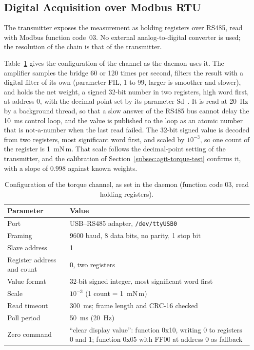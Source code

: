 \subsection{Digital Acquisition over Modbus RTU}
\label{subsec:agit-torque-acq}

The transmitter exposes the measurement as holding registers over RS485, read with Modbus function code~03. No external analog-to-digital converter is used; the resolution of the chain is that of the transmitter.

Table~\ref{tab:modbus} gives the configuration of the channel as the daemon uses it. The amplifier samples the bridge 60 or 120 times per second, filters the result with a digital filter of its own (parameter FIL, 1 to 99, larger is smoother and slower), and holds the net weight, a signed 32-bit number in two registers, high word first, at address 0, with the decimal point set by its parameter Sd~\citep{atoman2026,atomodbus2026}. It is read at 20~Hz by a background thread, so that a slow answer of the RS485 bus cannot delay the 10~ms control loop, and the value is published to the loop as an atomic number that is not-a-number when the last read failed. The 32-bit signed value is decoded from two registers, most significant word first, and scaled by $10^{-3}$, so one count of the register is 1~mN\,m. That scale follows the decimal-point setting of the transmitter, and the calibration of Section~\ref{subsec:agit-torque-test} confirms it, with a slope of 0.998 against known weights.

\begin{table}[htbp]
    \centering
    \caption[Serial and register configuration of the torque channel]{Configuration of the torque channel, as set in the daemon (function code 03, read holding registers).}
    \label{tab:modbus}
    \small
    \begin{tabular}{@{}ll@{}}
        \toprule
        Parameter & Value \\
        \midrule
        Port & USB--RS485 adapter, \texttt{/dev/ttyUSB0} \\
        Framing & 9600 baud, 8 data bits, no parity, 1 stop bit \\
        Slave address & 1 \\
        Register address and count & 0, two registers \\
        Value format & 32-bit signed integer, most significant word first \\
        Scale & $10^{-3}$ (1 count = 1~mN\,m) \\
        Read timeout & 300~ms; frame length and CRC-16 checked \\
        Poll period & 50~ms (20~Hz) \\
        Zero command & ``clear display value'': function 0x10, writing 0 to registers 0 and 1; function 0x05 with FF00 at address 0 as fallback~\citep{atomodbus2026} \\
        \bottomrule
    \end{tabular}
\end{table}

